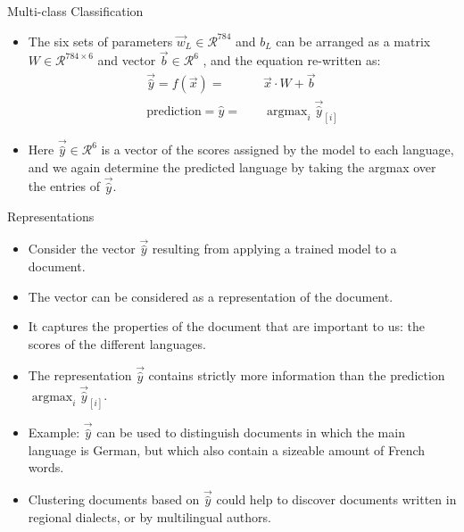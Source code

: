 \documentclass[handout]{beamer}
\begin{document}
\begin{frame}{Multi-class Classification}

\begin{scriptsize}
\begin{itemize}
\item The six sets of parameters $\vec{w}_L \in  \mathcal{R}^{784}$ and $b_L$  can be arranged as a matrix $W \in \mathcal{R}^{784\times6}$ and vector $\vec{b} \in \mathcal{R}^6$ , and the equation re-written as:
\begin{equation}
 \begin{split}
  \vec{\hat{y}} = f(\vec{x}) = \quad & \vec{x} \cdot W + \vec{b}\\
   \text{prediction} = \hat{y} = \quad  & \operatorname{argmax}_i \vec{\hat{y}}_{[i]} 
 \end{split}
\end{equation}

\item Here $\vec{\hat{y}} \in \mathcal{R}^6$ is a vector of the scores assigned by the model to each language, and we again determine the predicted language by taking the argmax over the entries of $\vec{\hat{y}}$.

\end{itemize}
\end{scriptsize}
\end{frame}


\begin{frame}{Representations}

\begin{scriptsize}
\begin{itemize}
\item Consider the vector $\vec{\hat{y}}$  resulting from applying a trained model to a document.
\item The vector can be considered as a representation of the document.
\item It captures the properties of the document that are important to us:  the scores of the different languages.
\item The representation $\vec{\hat{y}}$  contains strictly more information than the prediction $\operatorname{argmax}_i \vec{\hat{y}}_{[i]} $.
\item Example: $\vec{\hat{y}}$ can be used to distinguish documents in which the main language is German, but which also contain a sizeable amount of French words.
\item Clustering documents based on $\vec{\hat{y}}$ could help to discover documents written in regional dialects, or by multilingual authors.


\end{itemize}
\end{scriptsize}
\end{frame}
\end{document}
